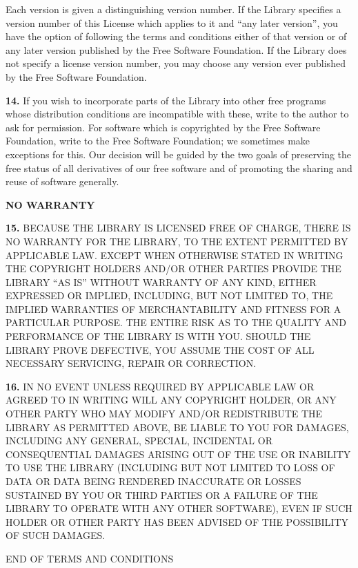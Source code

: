 {{{Each version is given a distinguishing version number. If the Library
specifies a version number of this License which applies to it and ``any later
version'', you have the option of following the terms and conditions either of
that version or of any later version published by the Free Software
Foundation. If the Library does not specify a license version number, you may
choose any version ever published by the Free Software Foundation. 

{\bf 14.} If you wish to incorporate parts of the Library into other free
programs whose distribution conditions are incompatible with these, write to
the author to ask for permission. For software which is copyrighted by the
Free Software Foundation, write to the Free Software Foundation; we sometimes
make exceptions for this. Our decision will be guided by the two goals of
preserving the free status of all derivatives of our free software and of
promoting the sharing and reuse of software generally. 

{\bf NO WARRANTY} 

{\bf 15.} BECAUSE THE LIBRARY IS LICENSED FREE OF CHARGE, THERE IS NO WARRANTY
FOR THE LIBRARY, TO THE EXTENT PERMITTED BY APPLICABLE LAW. EXCEPT WHEN
OTHERWISE STATED IN WRITING THE COPYRIGHT HOLDERS AND/OR OTHER PARTIES PROVIDE
THE LIBRARY ``AS IS'' WITHOUT WARRANTY OF ANY KIND, EITHER EXPRESSED OR
IMPLIED, INCLUDING, BUT NOT LIMITED TO, THE IMPLIED WARRANTIES OF
MERCHANTABILITY AND FITNESS FOR A PARTICULAR PURPOSE. THE ENTIRE RISK AS TO
THE QUALITY AND PERFORMANCE OF THE LIBRARY IS WITH YOU. SHOULD THE LIBRARY
PROVE DEFECTIVE, YOU ASSUME THE COST OF ALL NECESSARY SERVICING, REPAIR OR
CORRECTION. 

{\bf 16.} IN NO EVENT UNLESS REQUIRED BY APPLICABLE LAW OR AGREED TO IN
WRITING WILL ANY COPYRIGHT HOLDER, OR ANY OTHER PARTY WHO MAY MODIFY AND/OR
REDISTRIBUTE THE LIBRARY AS PERMITTED ABOVE, BE LIABLE TO YOU FOR DAMAGES,
INCLUDING ANY GENERAL, SPECIAL, INCIDENTAL OR CONSEQUENTIAL DAMAGES ARISING
OUT OF THE USE OR INABILITY TO USE THE LIBRARY (INCLUDING BUT NOT LIMITED TO
LOSS OF DATA OR DATA BEING RENDERED INACCURATE OR LOSSES SUSTAINED BY YOU OR
THIRD PARTIES OR A FAILURE OF THE LIBRARY TO OPERATE WITH ANY OTHER SOFTWARE),
EVEN IF SUCH HOLDER OR OTHER PARTY HAS BEEN ADVISED OF THE POSSIBILITY OF SUCH
DAMAGES. 

END OF TERMS AND CONDITIONS 

\subsection*{
}
\label{SEC45}

}}}
